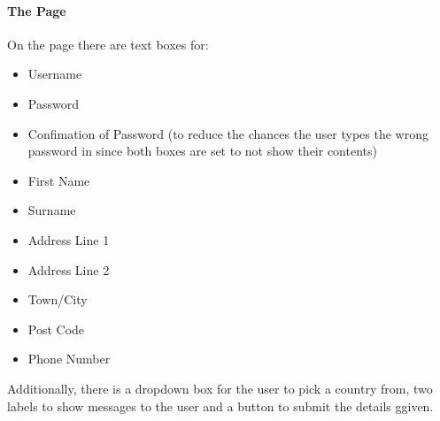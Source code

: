 ﻿\documentclass{article}
\begin{document}
    \paragraph{The Page}
    On the page there are text boxes for:
    \begin{itemize}
        \item Username
        \item Password
        \item Confimation of Password (to reduce the chances the user types the wrong password in since both boxes are set to not show their contents)
        \item First Name
        \item Surname
        \item Address Line 1
        \item Address Line 2
        \item Town/City
        \item Post Code
        \item Phone Number
    \end{itemize}
    Additionally, there is a dropdown box for the user to pick a country from, two labels to show messages to the user and a button to submit the details ggiven.
\end{document}
